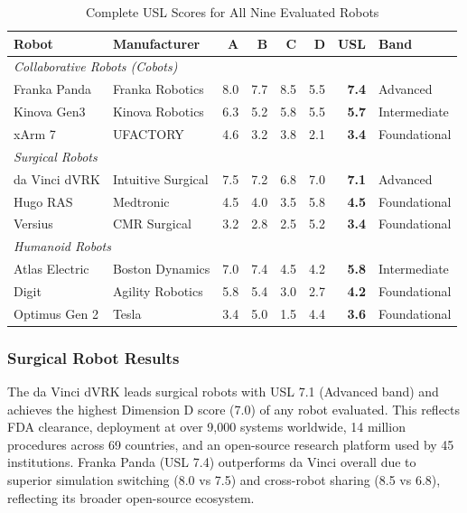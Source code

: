 \begin{table}[H]
\centering
\caption{Complete USL Scores for All Nine Evaluated Robots}
\label{tab:usl-all-scores}
\small
\begin{tabular}{l l r r r r r l}
\toprule
\textbf{Robot} & \textbf{Manufacturer} & \textbf{A} & \textbf{B} & \textbf{C} & \textbf{D} & \textbf{USL} & \textbf{Band} \\
\midrule
\multicolumn{8}{l}{\textit{Collaborative Robots (Cobots)}} \\
Franka Panda & Franka Robotics & 8.0 & 7.7 & 8.5 & 5.5 & \textbf{7.4} & Advanced \\
Kinova Gen3 & Kinova Robotics & 6.3 & 5.2 & 5.8 & 5.5 & \textbf{5.7} & Intermediate \\
xArm 7 & UFACTORY & 4.6 & 3.2 & 3.8 & 2.1 & \textbf{3.4} & Foundational \\
\midrule
\multicolumn{8}{l}{\textit{Surgical Robots}} \\
da Vinci dVRK & Intuitive Surgical & 7.5 & 7.2 & 6.8 & 7.0 & \textbf{7.1} & Advanced \\
Hugo RAS & Medtronic & 4.5 & 4.0 & 3.5 & 5.8 & \textbf{4.5} & Foundational \\
Versius & CMR Surgical & 3.2 & 2.8 & 2.5 & 5.2 & \textbf{3.4} & Foundational \\
\midrule
\multicolumn{8}{l}{\textit{Humanoid Robots}} \\
Atlas Electric & Boston Dynamics & 7.0 & 7.4 & 4.5 & 4.2 & \textbf{5.8} & Intermediate \\
Digit & Agility Robotics & 5.8 & 5.4 & 3.0 & 2.7 & \textbf{4.2} & Foundational \\
Optimus Gen 2 & Tesla & 3.4 & 5.0 & 1.5 & 4.4 & \textbf{3.6} & Foundational \\
\bottomrule
\end{tabular}
\end{table}

\subsubsection{Surgical Robot Results}

The da Vinci dVRK leads surgical robots with USL 7.1 (Advanced band) and
achieves the highest Dimension D score (7.0) of any robot evaluated. This
reflects FDA clearance, deployment at over 9,000 systems worldwide, 14 million
procedures across 69 countries, and an open-source research platform used by
45 institutions. Franka Panda (USL 7.4) outperforms da Vinci overall due to
superior simulation switching (8.0 vs 7.5) and cross-robot sharing (8.5 vs
6.8), reflecting its broader open-source ecosystem.

